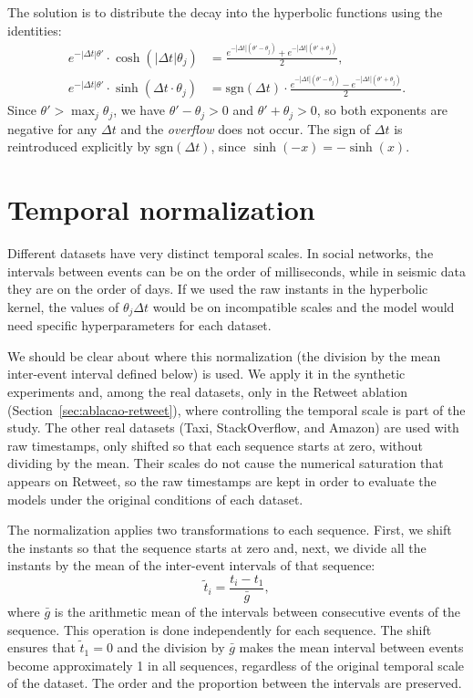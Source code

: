 The solution is to distribute the decay into the hyperbolic functions using the identities:
%
\begin{align}
    e^{-|\Delta t|\theta'} \cdot \cosh(|\Delta t|\theta_j)
    &= \frac{e^{-|\Delta t|(\theta' - \theta_j)} + e^{-|\Delta t|(\theta' + \theta_j)}}{2},
    \label{eq:decay-cosh}\\[4pt]
    e^{-|\Delta t|\theta'} \cdot \sinh(\Delta t \cdot \theta_j)
    &= \mathrm{sgn}(\Delta t) \cdot \frac{e^{-|\Delta t|(\theta' - \theta_j)} - e^{-|\Delta t|(\theta' + \theta_j)}}{2}.
    \label{eq:decay-sinh}
\end{align}
%
Since $\theta' > \max_j \theta_j$, we have $\theta' - \theta_j > 0$ and $\theta' + \theta_j > 0$, so both exponents are negative for any $\Delta t$ and the \textit{overflow} does not occur. The sign of $\Delta t$ is reintroduced explicitly by $\mathrm{sgn}(\Delta t)$, since $\sinh(-x) = -\sinh(x)$.

\section{Temporal normalization}
\label{sec:normalizacao-temporal}

Different datasets have very distinct temporal scales. In social networks, the intervals between events can be on the order of milliseconds, while in seismic data they are on the order of days. If we used the raw instants in the hyperbolic kernel, the values of $\theta_j \Delta t$ would be on incompatible scales and the model would need specific hyperparameters for each dataset.

We should be clear about where this normalization (the division by the mean inter-event interval defined below) is used. We apply it in the synthetic experiments and, among the real datasets, only in the Retweet ablation (Section~\ref{sec:ablacao-retweet}), where controlling the temporal scale is part of the study. The other real datasets (Taxi, StackOverflow, and Amazon) are used with raw timestamps, only shifted so that each sequence starts at zero, without dividing by the mean. Their scales do not cause the numerical saturation that appears on Retweet, so the raw timestamps are kept in order to evaluate the models under the original conditions of each dataset.

The normalization applies two transformations to each sequence. First, we shift the instants so that the sequence starts at zero and, next, we divide all the instants by the mean of the inter-event intervals of that sequence:
%
\begin{equation}
    \tilde{t}_i = \frac{t_i - t_1}{\bar{g}},
    \label{eq:normalizacao-temporal}
\end{equation}
%
where $\bar{g}$ is the arithmetic mean of the intervals between consecutive events of the sequence. This operation is done independently for each sequence. The shift ensures that $\tilde{t}_1 = 0$ and the division by $\bar{g}$ makes the mean interval between events become approximately 1 in all sequences, regardless of the original temporal scale of the dataset. The order and the proportion between the intervals are preserved.


